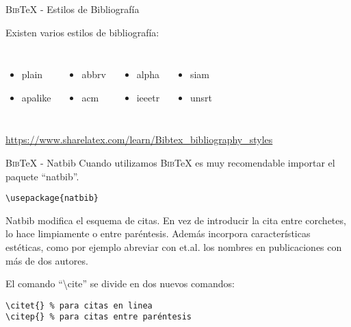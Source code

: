 \documentclass[11pt]{beamer}
\newcommand{\BibTeX}{\textsc{Bib}\TeX{}}
\begin{document}
\begin{frame}[fragile]{\BibTeX{} - Estilos de Bibliografía}

Existen varios estilos de bibliografía:

\begin{columns}
\begin{itemize}
\item plain
\item apalike
\end{itemize}
\begin{itemize}
\item abbrv
\item acm
\end{itemize}
\begin{itemize}
\item alpha
\item ieeetr
\end{itemize}
\begin{itemize}
\item siam
\item unsrt
\end{itemize}
\end{columns}

\vspace{2em}

{\footnotesize \url{https://www.sharelatex.com/learn/Bibtex_bibliography_styles}}

\end{frame}


\begin{frame}[fragile]{\BibTeX{} - Natbib}
Cuando utilizamos \BibTeX{} es muy recomendable importar el paquete ``natbib''.

{\color{new_green} \scriptsize
\begin{verbatim}
\usepackage{natbib}
\end{verbatim}
}

Natbib modifica el esquema de citas. En vez de introducir la cita entre corchetes, lo hace limpiamente o entre paréntesis. Además incorpora características estéticas, como por ejemplo abreviar con et.al. los nombres en publicaciones con más de dos autores.

El comando ``\textbackslash cite{}'' se divide en dos nuevos comandos:
{\color{new_green} \scriptsize
\begin{verbatim}
\citet{} % para citas en linea
\citep{} % para citas entre paréntesis
\end{verbatim}
}

\end{frame}
\end{document}
